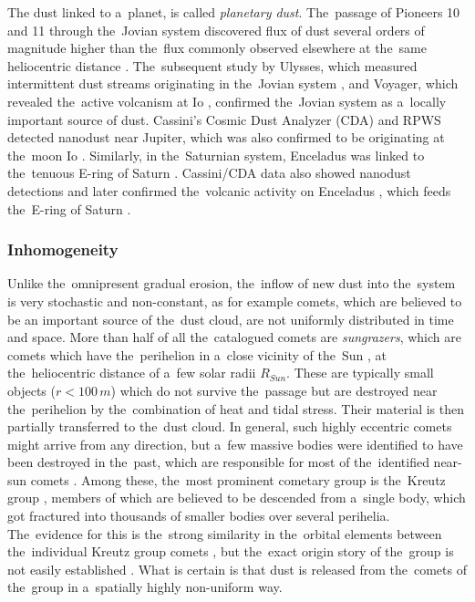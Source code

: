 The dust linked to a~planet, is called \textit{planetary dust}. The~passage of Pioneers 10 and 11 through the~Jovian system discovered flux of dust several orders of magnitude higher than the~flux commonly observed elsewhere at the~same heliocentric distance \citep{humes1974interplanetary}. The~subsequent study by Ulysses, which measured intermittent dust streams originating in the~Jovian system \citep{grun1993discovery}, and Voyager, which revealed the~active volcanism at Io \citep{kruger2004jovian}, confirmed the~Jovian system as a~locally important source of dust. Cassini's Cosmic Dust Analyzer ({CDA}) and RPWS detected nanodust near Jupiter, which was also confirmed to be originating at the~moon Io \citep{meyer2009detecting}. Similarly, in the~Saturnian system, Enceladus was linked to the~tenuous E-ring of Saturn \citep{baum1981saturn}. Cassini/CDA data also showed nanodust detections \citep{kempf2005high} and later confirmed the~volcanic activity on Enceladus \citep{spahn2006cassini}, which feeds the~E-ring of Saturn \citep{kempf2010enceladus}. 

\subsubsection{Inhomogeneity}

Unlike the~omnipresent gradual erosion, the~inflow of new dust into the~system is very stochastic and non-constant, as for example comets, which are believed to be an important source of the~dust cloud, are not uniformly distributed in time and space. More than half of all the~catalogued comets are \textit{sungrazers}, which are comets which have the~perihelion in a~close vicinity of the~Sun \citep{jones2018science}, at the~heliocentric distance of a~few solar radii $R_{Sun}$. These are typically small objects ($r<100 \, \si{m}$) which do not survive the~passage but are destroyed near the~perihelion by the~combination of heat and tidal stress. Their material is then partially transferred to the~dust cloud. In general, such highly eccentric comets might arrive from any direction, but a~few massive bodies were identified to have been destroyed in the~past, which are responsible for most of the~identified near-sun comets \citep{jones2018science}. Among these, the~most prominent cometary group is the~{Kreutz group} \citep{kreutz1888untersuchungen}, members of which are believed to be descended from a~single body, which got fractured into thousands of smaller bodies over several perihelia. The~evidence for this is the~strong similarity in the~orbital elements between the~individual Kreutz group comets \citep{jones2018science}, but the~exact origin story of the~group is not easily established \citep{kalinicheva2017specific,fernandez2021origin}. What is certain is that dust is released from the~comets of the~group in a~spatially highly non-uniform way. 

